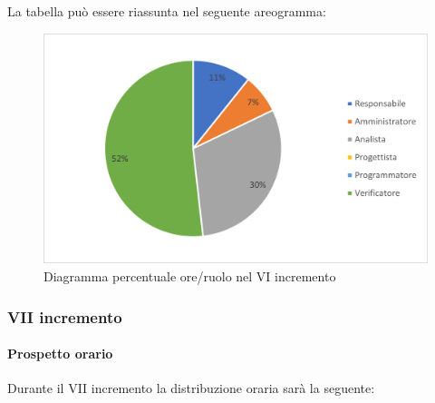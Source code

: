 La tabella può essere riassunta nel seguente areogramma:
\begin{figure}[H]
	\centering
	\includegraphics[width=0.8\linewidth]{res/images/preventivo/dettaglio_analisi/3-2.png}
	\caption{Diagramma percentuale ore/ruolo nel VI incremento}
	\label{fig:diagramma costi ruolo VI incremento}
\end{figure}

\subsubsection{VII incremento}
\paragraph{Prospetto orario}
Durante il VII incremento la distribuzione oraria sarà la seguente:

